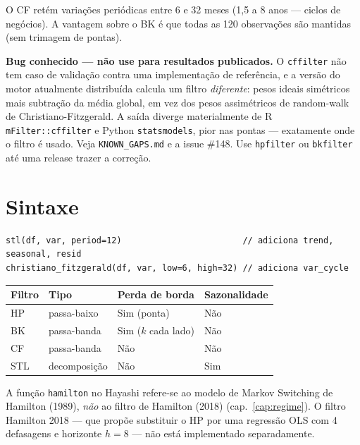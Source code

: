 O CF retém variações periódicas entre 6 e 32 meses (1{,}5 a 8 anos — ciclos
de negócios). A vantagem sobre o BK é que todas as 120 observações são mantidas
(sem trimagem de pontas).

\begin{aviso}
  \textbf{Bug conhecido --- não use para resultados publicados.} O
  \texttt{cffilter} não tem caso de validação contra uma implementação de
  referência, e a versão do motor atualmente distribuída calcula um filtro
  \emph{diferente}: pesos ideais simétricos mais subtração da média global, em
  vez dos pesos assimétricos de random-walk de Christiano-Fitzgerald. A saída
  diverge materialmente de R \texttt{mFilter::cffilter} e Python
  \texttt{statsmodels}, pior nas pontas --- exatamente onde o filtro é usado.
  Veja \texttt{KNOWN\_GAPS.md} e a issue \#148. Use \texttt{hpfilter} ou
  \texttt{bkfilter} até uma release trazer a correção.
\end{aviso}

\section{Sintaxe}

\begin{lstlisting}
stl(df, var, period=12)                        // adiciona trend, seasonal, resid
christiano_fitzgerald(df, var, low=6, high=32) // adiciona var_cycle
\end{lstlisting}

\begin{center}
\begin{tabular}{llll}
\toprule
\textbf{Filtro} & \textbf{Tipo} & \textbf{Perda de borda} & \textbf{Sazonalidade} \\
\midrule
HP              & passa-baixo    & Sim (ponta)         & Não \\
BK              & passa-banda    & Sim ($k$ cada lado) & Não \\
CF              & passa-banda    & Não                 & Não \\
STL             & decomposição   & Não                 & Sim \\
\bottomrule
\end{tabular}
\end{center}

\begin{nota}
  A função \texttt{hamilton} no Hayashi refere-se ao modelo de Markov
  Switching de Hamilton (1989), \emph{não} ao filtro de Hamilton (2018)
  (cap.~\ref{cap:regime}). O filtro Hamilton 2018 — que propõe substituir
  o HP por uma regressão OLS com 4 defasagens e horizonte $h = 8$ —
  não está implementado separadamente.
\end{nota}
